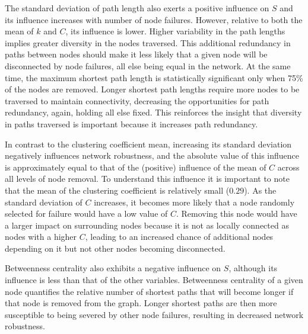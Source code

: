 The standard deviation of path length also exerts a positive influence on $S$ and its influence increases with number of node failures. However, relative to both the mean of $k$ and $C$, its influence is lower. Higher variability in the path lengths implies greater diversity in the nodes traversed. This additional redundancy in paths between nodes should make it less likely that a given node will be disconnected by node failures, all else being equal in the network. At the same time, the maximum shortest path length is statistically significant only when 75\% of the nodes are removed. Longer shortest path lengths require more nodes to be traversed to maintain connectivity, decreasing the opportunities for path redundancy, again, holding all else fixed. This reinforces the insight that diversity in paths traversed is important because it increases path redundancy.

In contrast to the clustering coefficient mean, increasing its standard deviation negatively influences network robustness, and the absolute value of this influence is approximately equal to that of the (positive) influence of the mean of $C$ across all levels of node removal. To understand this influence it is important to note that the mean of the clustering coefficient is relatively small ($0.29$). As the standard deviation of $C$ increases, it becomes more likely that a node randomly selected for failure would have a low value of $C$. Removing this node would have a larger impact on surrounding nodes because it is not as locally connected as nodes with a higher $C$, leading to an increased chance of additional nodes depending on it but not other nodes becoming disconnected.

Betweenness centrality also exhibits a negative influence on $S$, although its influence is less than that of the other variables. Betweenness centrality of a given node quantifies the relative number of shortest paths that will become longer if that node is removed from the graph. Longer shortest paths are then more susceptible to being severed by other node failures, resulting in decreased network robustness.

